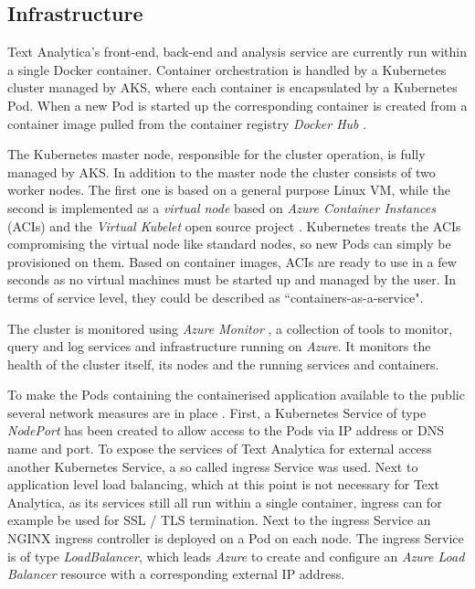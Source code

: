 \documentclass[conference]{IEEEtran}
\begin{document}
\subsection{Infrastructure}
\label{subsec:infra}
Text Analytica's front-end, back-end and analysis service are currently run within a single Docker container. Container orchestration is handled by a Kubernetes cluster managed by AKS, where each container is encapsulated by a Kubernetes Pod. When a new Pod is started up the corresponding container is created from a container image pulled from the container registry \textit{Docker Hub} \cite{DockerHub}.

The Kubernetes master node, responsible for the cluster operation, is fully managed by AKS. In addition to the master node the cluster consists of two worker nodes. The first one is based on a general purpose Linux VM, while the second is implemented as a \textit{virtual node} based on \textit{Azure Container Instances} (ACIs) \cite{AzureContainerInstances} and the \textit{Virtual Kubelet} open source project \cite{VirtualKubelet, VirtualKubeletGithub}. Kubernetes treats the ACIs compromising the virtual node like standard nodes, so new Pods can simply be provisioned on them. Based on container images, ACIs are ready to use in a few seconds as no virtual machines must be started up and managed by the user. In terms of service level, they could be described as ``containers-as-a-service".

The cluster is monitored using \textit{Azure Monitor} \cite{AzureMonitor}, a collection of tools to monitor, query and log services and infrastructure running on \textit{Azure}. It monitors the health of the cluster itself, its nodes and the running services and containers.

To make the Pods containing the containerised application available to the public several network measures are in place \cite{AKSNetworks, AzureExposeKubernetesCluster}. First, a Kubernetes Service of type \textit{NodePort} has been created to allow access to the Pods via IP address or DNS name and port. To expose the services of Text Analytica for external access another Kubernetes Service, a so called ingress Service was used. Next to application level load balancing, which at this point is not necessary for Text Analytica, as its services still all run within a single container, ingress can for example be used for SSL / TLS termination. Next to the ingress Service an NGINX ingress controller \cite{IngressController} is deployed on a Pod on each node. The ingress Service is of type \textit{LoadBalancer}, which leads \textit{Azure} to create and configure an \textit{Azure Load Balancer} resource with a corresponding external IP address.
\end{document}
